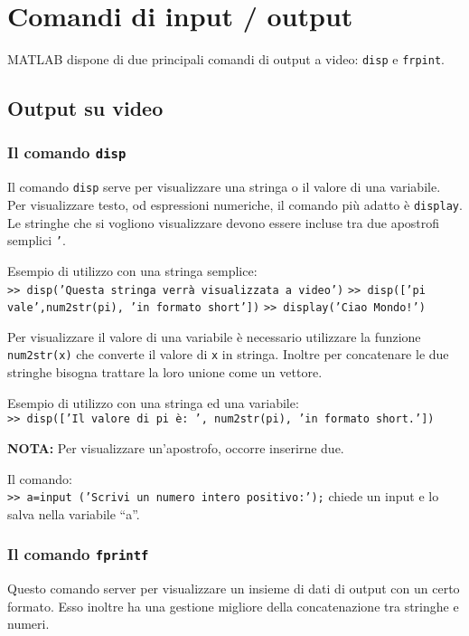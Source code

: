 \chapter{Comandi di input / output}
MATLAB dispone di due principali comandi di output a video: \texttt{disp} e \texttt{frpint}.
\section{Output su video}
\subsection{Il comando \texttt{disp}}
Il comando \texttt{disp} serve per visualizzare una stringa o il valore di una variabile. \\
Per visualizzare testo, od espressioni numeriche, il comando più adatto è \texttt{display}. \\
Le stringhe che si vogliono visualizzare devono essere incluse tra due apostrofi semplici \texttt{'}.
\break
			
Esempio di utilizzo con una stringa semplice: \\
\texttt{>> disp('Questa stringa verrà visualizzata a video')} 
\break
\texttt{>> disp(['pi vale',num2str(pi), 'in formato short'])} 
\break	
\texttt{>> display('Ciao Mondo!')} 
\break		

Per visualizzare il valore di una variabile è necessario utilizzare la funzione \texttt{num2str(x)} che converte il 
valore di \texttt{x} in stringa. Inoltre per concatenare le due stringhe bisogna trattare la loro unione come un 
vettore. 
\break
			
Esempio di utilizzo con una stringa ed una variabile: \\

\texttt{>> disp(['Il valore di pi è: ', num2str(pi), 'in formato short.'])}
\break

\textbf{NOTA:} Per visualizzare un'apostrofo, occorre inserirne due.

Il comando: \\

\texttt{>> a=input (’Scrivi un numero intero positivo:’);} chiede un input e lo salva nella variabile ``a''. 

\subsection{Il comando \texttt{fprintf}}
Questo comando server per visualizzare un insieme di dati di output con un certo formato. Esso inoltre ha una gestione 
migliore della concatenazione tra stringhe e numeri.
\break
			
